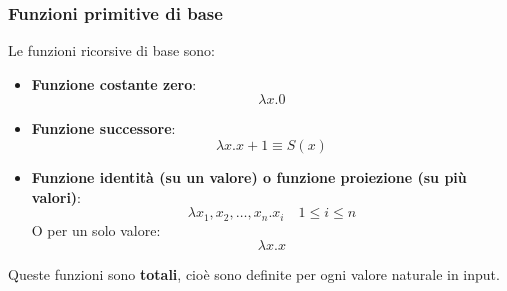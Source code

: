 \documentclass[a4paper]{article}
\begin{document}
\subsubsection{Funzioni primitive di base}
Le funzioni ricorsive di base sono:
\begin{itemize}
  \item \textbf{Funzione costante zero}:
    \[
      \lambda x. 0
    \] 
  \item \textbf{Funzione successore}:
    \[
      \lambda x. x + 1 \equiv S(x)
    \]
  \item \textbf{Funzione identità (su un valore) o funzione proiezione (su più valori)}:
    \[
      \lambda x_1, x_2, \ldots, x_n. x_i \quad 1 \le i \le n
    \]
    O per un solo valore:
    \[
      \lambda x. x
    \] 
\end{itemize}
Queste funzioni sono \textbf{totali}, cioè sono definite per ogni valore naturale in input.
\end{document}
